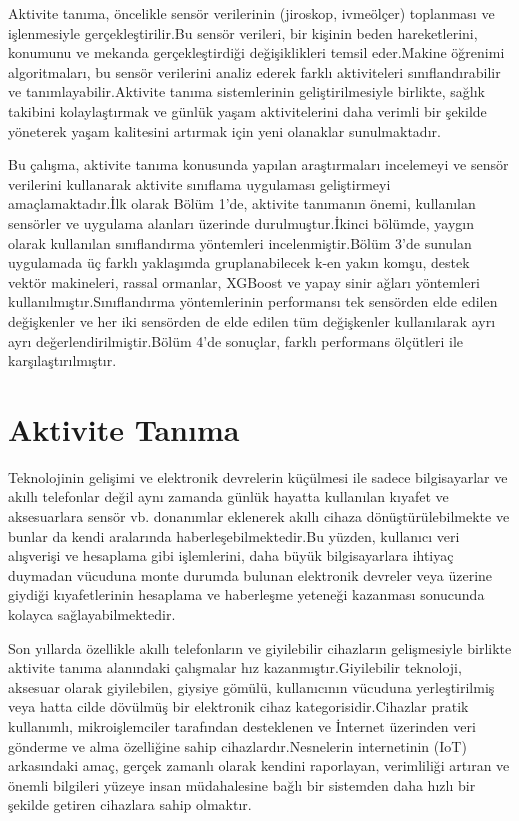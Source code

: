 \documentclass[12pt,twoside]{deuthesis}
\begin{document}
Aktivite tanıma, öncelikle sensör verilerinin (jiroskop, ivmeölçer) toplanması ve işlenmesiyle gerçekleştirilir.Bu sensör verileri, bir kişinin beden hareketlerini, konumunu ve mekanda gerçekleştirdiği değişiklikleri temsil eder.Makine öğrenimi algoritmaları, bu sensör verilerini analiz ederek farklı aktiviteleri sınıflandırabilir ve tanımlayabilir.Aktivite tanıma sistemlerinin geliştirilmesiyle birlikte, sağlık takibini kolaylaştırmak ve günlük yaşam aktivitelerini daha verimli bir şekilde yöneterek yaşam kalitesini artırmak için yeni olanaklar sunulmaktadır.

Bu çalışma, aktivite tanıma konusunda yapılan araştırmaları incelemeyi ve sensör verilerini kullanarak aktivite sınıflama uygulaması geliştirmeyi amaçlamaktadır.İlk olarak Bölüm 1'de, aktivite tanımanın önemi, kullanılan sensörler ve uygulama alanları üzerinde durulmuştur.İkinci bölümde, yaygın olarak kullanılan sınıflandırma yöntemleri incelenmiştir.Bölüm 3'de sunulan uygulamada üç farklı yaklaşımda gruplanabilecek k-en yakın komşu, destek vektör makineleri, rassal ormanlar, XGBoost ve yapay sinir ağları yöntemleri kullanılmıştır.Sınıflandırma yöntemlerinin performansı tek sensörden elde edilen değişkenler ve her iki sensörden de elde edilen tüm değişkenler kullanılarak ayrı ayrı değerlendirilmiştir.Bölüm 4'de sonuçlar, farklı performans ölçütleri ile karşılaştırılmıştır.

\hypertarget{aktivite-tanux131ma}{%
\chapter{Aktivite Tanıma}\label{aktivite-tanux131ma}}

Teknolojinin gelişimi ve elektronik devrelerin küçülmesi ile sadece bilgisayarlar ve akıllı telefonlar değil aynı zamanda günlük hayatta kullanılan kıyafet ve aksesuarlara sensör vb. donanımlar eklenerek akıllı cihaza dönüştürülebilmekte ve bunlar da kendi aralarında haberleşebilmektedir.Bu yüzden, kullanıcı veri alışverişi ve hesaplama gibi işlemlerini, daha büyük bilgisayarlara ihtiyaç duymadan vücuduna monte durumda bulunan elektronik devreler veya üzerine giydiği kıyafetlerinin hesaplama ve haberleşme yeteneği kazanması sonucunda kolayca sağlayabilmektedir.

Son yıllarda özellikle akıllı telefonların ve giyilebilir cihazların gelişmesiyle birlikte aktivite tanıma alanındaki çalışmalar hız kazanmıştır.Giyilebilir teknoloji, aksesuar olarak giyilebilen, giysiye gömülü, kullanıcının vücuduna yerleştirilmiş veya hatta cilde dövülmüş bir elektronik cihaz kategorisidir.Cihazlar pratik kullanımlı, mikroişlemciler tarafından desteklenen ve İnternet üzerinden veri gönderme ve alma özelliğine sahip cihazlardır.Nesnelerin internetinin (IoT) arkasındaki amaç, gerçek zamanlı olarak kendini raporlayan, verimliliği artıran ve önemli bilgileri yüzeye insan müdahalesine bağlı bir sistemden daha hızlı bir şekilde getiren cihazlara sahip olmaktır.
\end{document}
